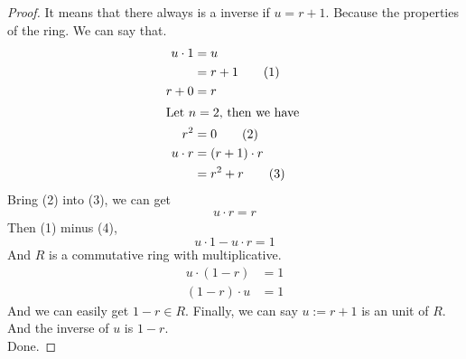 \documentclass[a4paper]{article}
\begin{document}
\begin{description}
\begin{proof}
  It means that there always is a inverse if $u=r+1$.
  Because the properties of the ring. We can say that.
  \begin{align}
    u \cdot 1&=u\notag\\
    &=r+1\tag{1}\\
    r+0&=r\notag\\
    \intertext{Let $n=2$, then we have }
    r^{2}&=0\tag{2}\notag\\
    u\cdot r&=(r+1)\cdot r\notag\\
    &=r^{2}+r\tag{3}
  \end{align}
  Bring (2) into (3), we can get
  \begin{align}
    u\cdot r=r\tag{4}
  \end{align}
  Then (1) minus (4),$$u\cdot 1-u\cdot r=1$$
  And $R$ is a commutative ring with multiplicative.
  \begin{align*}
    u\cdot (1-r)&=1\\
    (1-r)\cdot u&=1
  \end{align*}
  And we can easily get $1-r \in R$. Finally, we can say $u:=r+1$ is
  an unit of $R$. And the inverse of $u$ is $1-r$.\\
  Done.
\end{proof}

\end{description}
\end{document}
